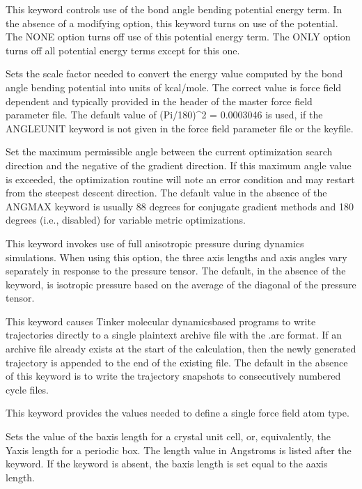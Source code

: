 \documentclass[letterpaper,11pt,english]{sphinxmanual}
\begin{document}
  This keyword controls use of the bond angle bending potential energy term. In the absence of a modifying option, this keyword turns on use of the potential. The NONE option turns off use of this potential energy term. The ONLY option turns off all potential energy terms except for this one.

  Sets the scale factor needed to convert the energy value computed by the bond angle bending potential into units of kcal/mole. The correct value is force field dependent and typically provided in the header of the master force field parameter file. The default value of (Pi/180)\textasciicircum{}2 = 0.0003046 is used, if the ANGLEUNIT keyword is not given in the force field parameter file or the keyfile.

  Set the maximum permissible angle between the current optimization search direction and the negative of the gradient direction. If this maximum angle value is exceeded, the optimization routine will note an error condition and may restart from the steepest descent direction. The default value in the absence of the ANGMAX keyword is usually 88 degrees for conjugate gradient methods and 180 degrees (i.e., disabled) for variable metric optimizations.

  This keyword invokes use of full anisotropic pressure during dynamics simulations. When using this option, the three axis lengths and axis angles vary separately in response to the pressure tensor. The default, in the absence of the keyword, is isotropic pressure based on the average of the diagonal of the pressure tensor.

  This keyword causes Tinker molecular dynamics\sphinxhyphen{}based programs to write trajectories directly to a single plain\sphinxhyphen{}text archive file with the .arc format. If an archive file already exists at the start of the calculation, then the newly generated trajectory is appended to the end of the existing file. The default in the absence of this keyword is to write the trajectory snapshots to consecutively numbered cycle files.

  This keyword provides the values needed to define a single force field atom type.

  Sets the value of the b\sphinxhyphen{}axis length for a crystal unit cell, or, equivalently,  the Y\sphinxhyphen{}axis length for a periodic box. The length value in Angstroms is listed after the keyword. If the keyword is absent, the b\sphinxhyphen{}axis length is set equal to the a\sphinxhyphen{}axis length.
\end{document}
